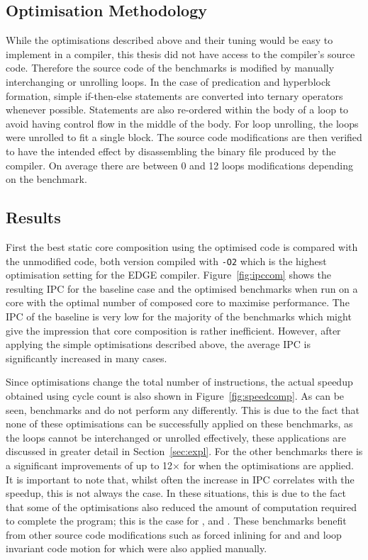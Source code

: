 \subsection{Optimisation Methodology}
While the optimisations described above and their tuning would be easy to implement in a compiler, this thesis did not have access to the compiler's source code.
Therefore the source code of the benchmarks is modified by manually interchanging or unrolling loops.
In the case of predication and hyperblock formation, simple if-then-else statements are converted into ternary operators whenever possible.
Statements are also re-ordered within the body of a loop to avoid having control flow in the middle of the body.
For loop unrolling, the loops were unrolled to fit a single block.
The source code modifications are then verified to have the intended effect by disassembling the binary file produced by the compiler.
On average there are between 0 and 12 loops modifications depending on the benchmark.

\subsection{Results}
First the best static core composition using the optimised code is compared with the unmodified code, both version compiled with \texttt{-O2} which is the highest optimisation setting for the EDGE compiler.
Figure~\ref{fig:ipccom} shows the resulting IPC for the baseline case and the optimised benchmarks when run on a core with the optimal number of composed core to maximise performance.
The IPC of the baseline is very low for the majority of the benchmarks which might give the impression that core composition is rather inefficient.
However, after applying the simple optimisations described above, the average IPC is significantly increased in many cases.

Since optimisations change the total number of instructions, the actual speedup obtained using cycle count is also shown in Figure~\ref{fig:speedcomp}.
As can be seen, benchmarks  and  do not perform any differently.
This is due to the fact that none of these optimisations can be successfully applied on these benchmarks, as the loops cannot be interchanged or unrolled effectively, these applications are discussed in greater detail in Section~\ref{sec:expl}.
For the other benchmarks there is a significant improvements of up to 12$\times$ for  when the optimisations are applied.
It is important to note that, whilst often the increase in IPC correlates with the speedup, this is not always the case.
In these situations, this is due to the fact that some of the optimisations also reduced the amount of computation required to complete the program; this is the case for ,  and .
These benchmarks benefit from other source code modifications such as forced inlining for  and  and loop invariant code motion for  which were also applied manually.

